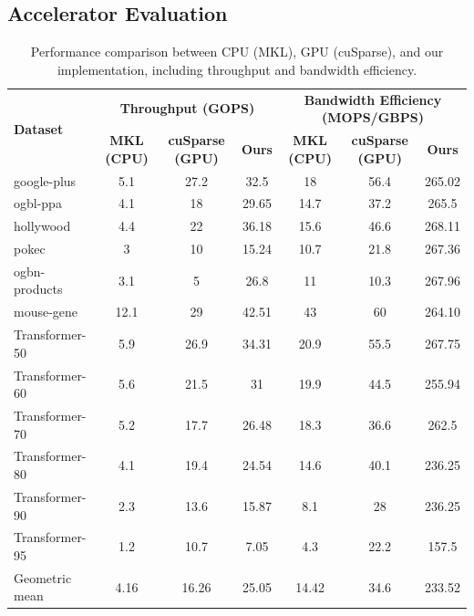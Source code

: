 \documentclass[manuscript,screen,review]{acmart}
\begin{document}
\subsection{Accelerator Evaluation}

\begin{table}[h!]
	\centering
	\begin{tabular}{|l|c|c|c|c|c|c|}
		\hline
		\multirow{2}{*}{\textbf{Dataset}} & \multicolumn{3}{c|}{\textbf{Throughput (GOPS)}} & \multicolumn{3}{c|}{\textbf{Bandwidth Efficiency (MOPS/GBPS)}} \\
		\cline{2-7}
		& \textbf{MKL (CPU)} & \textbf{cuSparse (GPU)} & \textbf{Ours} & \textbf{MKL (CPU)} & \textbf{cuSparse (GPU)} & \textbf{Ours} \\
		\hline
		google-plus & 5.1 & 27.2 & 32.5 & 18 & 56.4 & 265.02 \\		
		ogbl-ppa & 4.1 & 18 & 29.65 & 14.7 & 37.2 & 265.5 \\		
		hollywood & 4.4 & 22 & 36.18 & 15.6 & 46.6 & 268.11 \\		
		pokec & 3 & 10 & 15.24 & 10.7 & 21.8 & 267.36 \\		
		ogbn-products & 3.1 & 5 & 26.8 & 11 & 10.3 & 267.96 \\		
		mouse-gene & 12.1 & 29 & 42.51 & 43 & 60 & 264.10 \\		
		Transformer-50 & 5.9 & 26.9 & 34.31 & 20.9 & 55.5 & 267.75 \\		
		Transformer-60 & 5.6 & 21.5 & 31 & 19.9 & 44.5 & 255.94 \\				
		Transformer-70 & 5.2 & 17.7 & 26.48 & 18.3 & 36.6 & 262.5 \\		
		Transformer-80 & 4.1 & 19.4  & 24.54 & 14.6  & 40.1  & 236.25 \\
		Transformer-90 & 2.3 & 13.6 & 15.87 & 8.1 & 28 & 236.25 \\				
		Transformer-95 & 1.2 & 10.7 & 7.05 & 4.3 & 22.2 & 157.5 \\
		\hline
		Geometric mean & 4.16 & 16.26 & 25.05 & 14.42 & 34.6 & 233.52 \\
		\hline
	\end{tabular}
	\caption{Performance comparison between CPU (MKL), GPU (cuSparse), and our implementation, including throughput and bandwidth efficiency.}
	\label{cpu-gpu}
\end{table}
\end{document}
